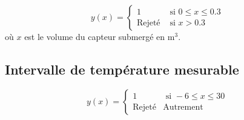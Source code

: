 \begin{equation}
y(x) = \begin{cases}
        1 & \text{ si }0 \le x \leq 0.3\\
        \text{Rejeté} & \text{ si } x > 0.3
    \end{cases}
    \label{eq:bareme_volume_capteur}
\end{equation}
où $x$ est le volume du capteur submergé en m$^3$.


\subsection{Intervalle de température mesurable}


\begin{equation}
y(x) = \begin{cases}
    1 & \text{ si } -6 \leq x \leq 30\\
    \text{Rejeté} & \text{Autrement}
    \end{cases}
    \label{eq:bareme_mesure_temperature}
\end{equation}







